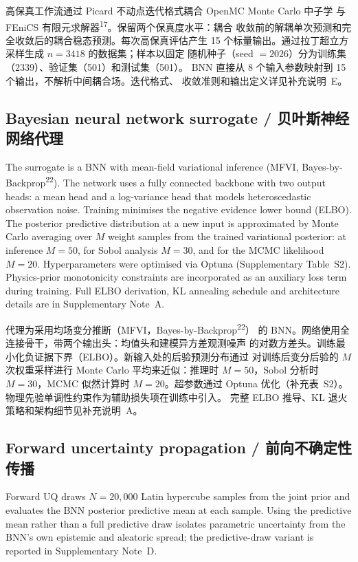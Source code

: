 \documentclass[11pt,a4paper]{article}
\begin{document}
高保真工作流通过 Picard 不动点迭代格式耦合 OpenMC Monte Carlo 中子学
与 FEniCS 有限元求解器\textsuperscript{17}。保留两个保真度水平：耦合
收敛前的解耦单次预测和完全收敛后的耦合稳态预测。每次高保真评估产生
15 个标量输出。通过拉丁超立方采样生成 $n = 3418$ 的数据集；样本以固定
随机种子（seed $= 2026$）分为训练集（2339）、验证集（501）和测试集（501）。
BNN 直接从 8 个输入参数映射到 15 个输出，不解析中间耦合场。迭代格式、
收敛准则和输出定义详见补充说明~E。

\subsection{Bayesian neural network surrogate / 贝叶斯神经网络代理}

The surrogate is a BNN with mean-field variational inference (MFVI,
Bayes-by-Backprop\textsuperscript{22}). The network uses a fully
connected backbone with two output heads: a mean head and a log-variance
head that models heteroscedastic observation noise. Training minimises
the negative evidence lower bound (ELBO). The posterior predictive
distribution at a new input is approximated by Monte Carlo averaging
over $M$ weight samples from the trained variational posterior: at
inference $M = 50$, for Sobol analysis $M = 30$, and for the MCMC
likelihood $M = 20$. Hyperparameters were optimised via Optuna
(Supplementary Table~S2). Physics-prior monotonicity constraints are
incorporated as an auxiliary loss term during training. Full ELBO
derivation, KL annealing schedule and architecture details are in
Supplementary Note~A.

代理为采用均场变分推断（MFVI，Bayes-by-Backprop\textsuperscript{22}）
的 BNN。网络使用全连接骨干，带两个输出头：均值头和建模异方差观测噪声
的对数方差头。训练最小化负证据下界（ELBO）。新输入处的后验预测分布通过
对训练后变分后验的 $M$ 次权重采样进行 Monte Carlo 平均来近似：推理时
$M = 50$，Sobol 分析时 $M = 30$，MCMC 似然计算时 $M = 20$。超参数通过
Optuna 优化（补充表~S2）。物理先验单调性约束作为辅助损失项在训练中引入。
完整 ELBO 推导、KL 退火策略和架构细节见补充说明~A。

\subsection{Forward uncertainty propagation / 前向不确定性传播}

Forward UQ draws $N = 20{,}000$ Latin hypercube samples from the joint
prior and evaluates the BNN posterior predictive mean at each sample.
Using the predictive mean rather than a full predictive draw isolates
parametric uncertainty from the BNN's own epistemic and aleatoric spread;
the predictive-draw variant is reported in Supplementary Note~D.
\end{document}

